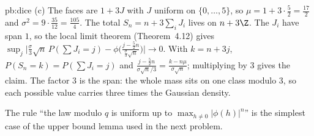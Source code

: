\begin{solution}{pb:dice}
(c) The faces are $1+3J$ with $J$ uniform on $\{0,\dots,5\}$, so $\mu=1+3\cdot\frac52=\frac{17}2$ and $\sigma^2=9\cdot\frac{35}{12}=\frac{105}4$. The total $S_n=n+3\sum_iJ_i$ lives on
$n+3\Z$. The $J_i$ have span $1$, so the local limit theorem (Theorem~4.12) gives
$\sup_j\bigl|\frac\sigma3\sqrt n\,P(\sum J_i=j)-\phi\bigl(\frac{j-\frac52n}{\frac\sigma3\sqrt n}\bigr)\bigr|\to0$. With $k=n+3j$, $P(S_n=k)=P(\sum J_i=j)$ and
$\frac{j-\frac52n}{\sigma\sqrt n/3}=\frac{k-n\mu}{\sigma\sqrt n}$; multiplying by $3$ gives the claim. The factor $3$ is the span: the whole mass sits on one class modulo $3$,
so each possible value carries three times the Gaussian density.

\leads The rule ``the law modulo $q$ is uniform up to $\max_{h\ne0}|\phi(h)|^n$'' is the simplest case of the upper bound lemma used in the next problem.
\end{solution}

